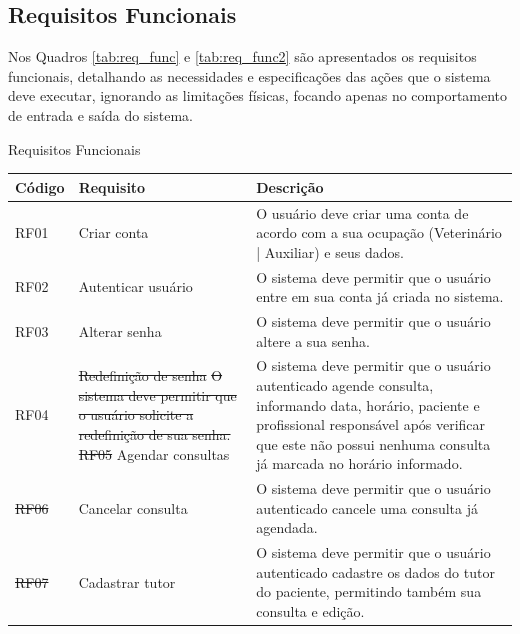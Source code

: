 \documentclass[
    12pt,               %
    openright,          %
    oneside,
    a4paper,            %
    BIBLATEX,           %
    TODO,               %
    english,            %
    brazil              %
    ]{ifsp-spo-inf-ctds}
\providecommand{\DIFadd}[1]{{\protect\color{blue}\uwave{#1}}} %
\providecommand{\DIFdel}[1]{{\protect\color{red}\sout{#1}}}                      %
\providecommand{\DIFaddbegin}{} %
\providecommand{\DIFaddend}{} %
\providecommand{\DIFdelbegin}{} %
\providecommand{\DIFdelend}{} %
\newcommand{\DIFscaledelfig}{0.5}
\newlength{\DIFdelgraphicswidth} %
\newlength{\DIFdelgraphicsheight} %
\newcommand{\DIFaddincludegraphics}[2][]{{\color{blue}\fbox{\DIFOincludegraphics[#1]{#2}}}} %
\newcommand{\DIFdelincludegraphics}[2][]{%
\sbox{\DIFdelgraphicsbox}{\DIFOincludegraphics[#1]{#2}}%
\settoboxwidth{\DIFdelgraphicswidth}{\DIFdelgraphicsbox} %
\settoboxtotalheight{\DIFdelgraphicsheight}{\DIFdelgraphicsbox} %
\scalebox{\DIFscaledelfig}{%
\parbox[b]{\DIFdelgraphicswidth}{\usebox{\DIFdelgraphicsbox}\\[-\baselineskip] \rule{\DIFdelgraphicswidth}{0em}}\llap{\resizebox{\DIFdelgraphicswidth}{\DIFdelgraphicsheight}{%
\setlength{\unitlength}{\DIFdelgraphicswidth}%
\begin{picture}(1,1)%
\thicklines\linethickness{2pt} %
{\color[rgb]{1,0,0}\put(0,0){\framebox(1,1){}}}%
{\color[rgb]{1,0,0}\put(0,0){\line( 1,1){1}}}%
{\color[rgb]{1,0,0}\put(0,1){\line(1,-1){1}}}%
\end{picture}%
}\hspace*{3pt}}} %
} %
\DeclareRobustCommand{\DIFaddbegin}{\DIFOaddbegin \let\includegraphics\DIFaddincludegraphics} %
\DeclareRobustCommand{\DIFaddend}{\DIFOaddend \let\includegraphics\DIFOincludegraphics} %
\DeclareRobustCommand{\DIFdelbegin}{\DIFOdelbegin \let\includegraphics\DIFdelincludegraphics} %
\DeclareRobustCommand{\DIFdelend}{\DIFOaddend \let\includegraphics\DIFOincludegraphics} %
\begin{document}
        \subsection{Requisitos Funcionais}

            Nos Quadros \ref{tab:req_func} e \ref{tab:req_func2} são apresentados os requisitos funcionais, detalhando as necessidades e especificações das ações que o sistema deve executar, ignorando as limitações físicas, focando apenas no comportamento de entrada e saída do sistema.

            \begin{center}
                \begin{quadro}[H]
                \caption{Requisitos Funcionais}
                \begin{tabulary}{1.0\textwidth}{|p{5em}|p{8em}|p{18em}|}
                \hline
                Código & Requisito & Descrição\\
                \hline
                RF01 & Criar conta & O usuário deve criar uma conta de acordo com a sua ocupação (Veterinário | Auxiliar) e seus dados.\\
                \hline
                RF02 & Autenticar usuário & O sistema deve permitir que o usuário entre em sua conta já criada no sistema.\\
                \hline
                RF03 & Alterar senha & O sistema deve permitir que o usuário altere a sua senha.\\
                \hline
                RF04 & \DIFdelbegin \DIFdel{Redefinição de senha }%
\DIFdel{O sistema deve permitir que o usuário solicite a redefinição de sua senha.}%
\DIFdel{RF05 }%
\DIFdelend Agendar consultas & O sistema deve permitir que o usuário autenticado agende consulta, informando data, horário, paciente e profissional responsável após verificar que este não possui nenhuma consulta já marcada no horário informado.\\
                \hline
                \DIFdelbegin \DIFdel{RF06 }\DIFdelend \DIFaddbegin \DIFadd{RF05 }\DIFaddend & Cancelar consulta & O sistema deve permitir que o usuário autenticado cancele uma consulta já agendada.\\
                \hline
                \DIFdelbegin \DIFdel{RF07 }\DIFdelend \DIFaddbegin \DIFadd{RF06 }\DIFaddend & Cadastrar tutor & O sistema deve permitir que o usuário autenticado cadastre os dados do tutor do paciente, permitindo também sua consulta e edição.\\

\end{tabulary}
\end{quadro}
\end{center}
\end{document}
